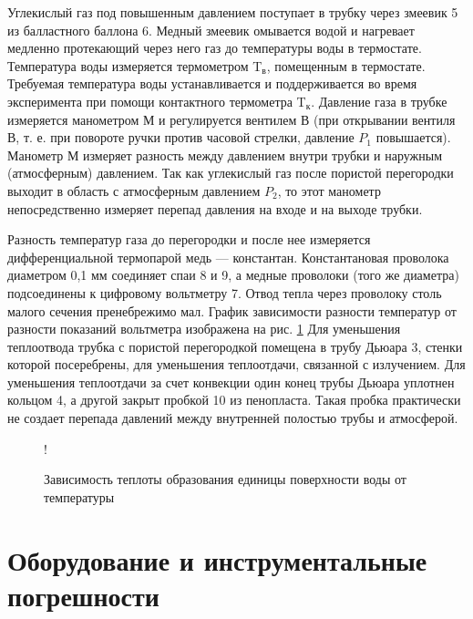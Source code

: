 \documentclass[a4paper,12pt]{article} %
\begin{document}
Углекислый газ под повышенным давлением поступает в трубку через змеевик 5 из балластного баллона 6. Медный змеевик омывается водой и нагревает медленно протекающий через него газ до температуры воды в термостате. Температура воды измеряется термометром T$_\text{в}$, помещенным в термостате. Требуемая температура воды устанавливается и поддерживается во время эксперимента при помощи контактного термометра T$_\text{к}$. Давление газа в трубке измеряется манометром М и регулируется вентилем В (при открывании вентиля В, т. е. при повороте ручки против часовой стрелки, давление $P_1$ повышается). Манометр М измеряет разность между давлением внутри трубки и наружным (атмосферным) давлением. Так как углекислый газ после пористой перегородки выходит в область с атмосферным давлением $P_2$, то этот манометр непосредственно измеряет перепад давления на входе и на выходе трубки. 

Разность температур газа до перегородки и после нее измеряется дифференциальной термопарой медь — константан. Константановая проволока диаметром 0,1 мм соединяет спаи 8 и 9, а медные проволоки (того же диаметра) подсоединены к цифровому вольтметру 7. Отвод тепла через проволоку столь малого сечения пренебрежимо мал. График зависимости разности температур от разности показаний вольтметра изображена на рис. \ref{graph0} Для уменьшения теплоотвода трубка с пористой перегородкой помещена в трубу Дьюара 3, стенки которой посеребрены, для уменьшения теплоотдачи, связанной с излучением. Для уменьшения теплоотдачи за счет конвекции один конец трубы Дьюара уплотнен кольцом 4, а другой закрыт пробкой 10 из пенопласта. Такая пробка практически не создает перепада давлений между внутренней полостью трубы и атмосферой.

\begin{figure}
\centering
{} {!} {
}
\caption{Зависимость теплоты образования единицы поверхности воды от температуры}
\label{graph0}
\end{figure}

\section{Оборудование и инструментальные погрешности}
\end{document}
